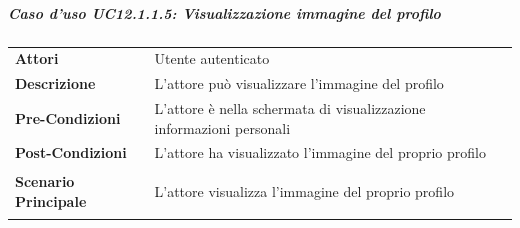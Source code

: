 \subparagraph{Caso d'uso UC12.1.1.5: Visualizzazione immagine del profilo}
\label{UC12_1_1_5}
\begin{minipage}{\linewidth}
	\begin{tabular}{ l | p{11cm}}
		\hline
		\rowcolor{Gray}
		\multicolumn{2}{c}{UC12.1.1.5 - Visualizzazione immagine del profilo} \\
		\hline
		\textbf{Attori} & Utente autenticato \\
		\textbf{Descrizione} & L'attore può visualizzare l'immagine del profilo\\
		\textbf{Pre-Condizioni} & L'attore è nella schermata di visualizzazione informazioni personali\\
		\textbf{Post-Condizioni} & L'attore ha visualizzato l'immagine del proprio profilo \\
		\textbf{Scenario Principale} & 
		\begin{enumerate*}[label=(\arabic*.),itemjoin={\newline}]
			\item L'attore visualizza l'immagine del proprio profilo
		\end{enumerate*}
	\end{tabular}
\end{minipage}

